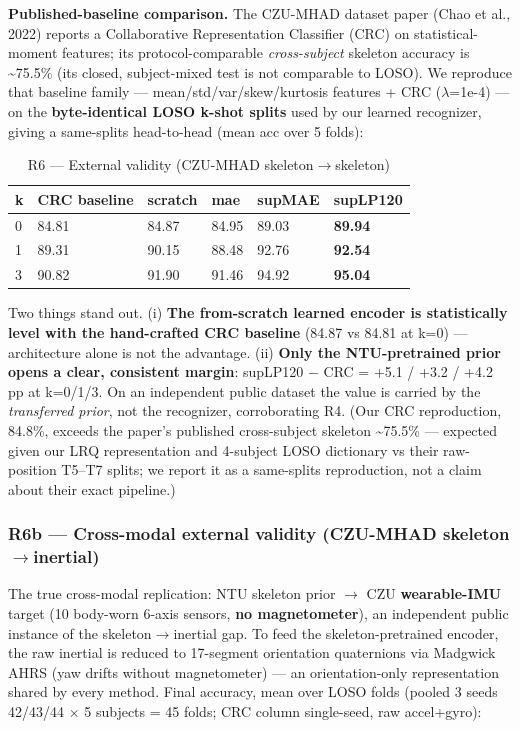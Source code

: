 \textbf{Published-baseline comparison.} The CZU-MHAD dataset paper (Chao et al., 2022) reports a Collaborative Representation Classifier (CRC) on statistical-moment features; its protocol-comparable \textit{cross-subject} skeleton accuracy is \textasciitilde{}75.5\% (its closed, subject-mixed test is not comparable to LOSO). We reproduce that baseline family --- mean/std/var/skew/kurtosis features + CRC ($\lambda$=1e-4) --- on the \textbf{byte-identical LOSO k-shot splits} used by our learned recognizer, giving a same-splits head-to-head (mean acc over 5 folds):

\begin{table}[!t]
\centering
\caption{R6 --- External validity (CZU-MHAD skeleton$\rightarrow$skeleton)}
\small
\begin{tabular}{llllll}
\toprule
k & CRC baseline & scratch & mae & supMAE & supLP120 \\
\midrule
0 & 84.81 & 84.87 & 84.95 & 89.03 & \textbf{89.94} \\
1 & 89.31 & 90.15 & 88.48 & 92.76 & \textbf{92.54} \\
3 & 90.82 & 91.90 & 91.46 & 94.92 & \textbf{95.04} \\
\bottomrule
\end{tabular}
\end{table}

Two things stand out. (i) \textbf{The from-scratch learned encoder is statistically level with the hand-crafted CRC baseline} (84.87 vs 84.81 at k=0) --- architecture alone is not the advantage. (ii) \textbf{Only the NTU-pretrained prior opens a clear, consistent margin}: supLP120 $-$ CRC = +5.1 / +3.2 / +4.2 pp at k=0/1/3. On an independent public dataset the value is carried by the \textit{transferred prior}, not the recognizer, corroborating R4. (Our CRC reproduction, 84.8\%, exceeds the paper's published cross-subject skeleton \textasciitilde{}75.5\% --- expected given our LRQ representation and 4-subject LOSO dictionary vs their raw-position T5--T7 splits; we report it as a same-splits reproduction, not a claim about their exact pipeline.)

\subsubsection{R6b --- Cross-modal external validity (CZU-MHAD skeleton$\rightarrow$inertial)}

The true cross-modal replication: NTU skeleton prior $\rightarrow$ CZU \textbf{wearable-IMU} target (10 body-worn 6-axis sensors, \textbf{no magnetometer}), an independent public instance of the skeleton$\rightarrow$inertial gap. To feed the skeleton-pretrained encoder, the raw inertial is reduced to 17-segment orientation quaternions via Madgwick AHRS (yaw drifts without magnetometer) --- an orientation-only representation shared by every method. Final accuracy, mean over LOSO folds (pooled 3 seeds 42/43/44 $\times$ 5 subjects = 45 folds; CRC column single-seed, raw accel+gyro):

